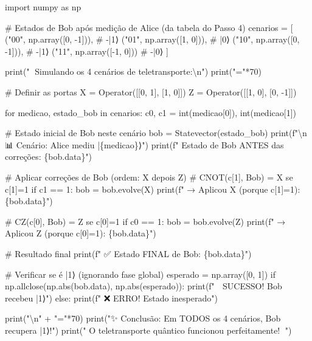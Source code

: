 \documentclass[
  brazilian,
]{report}
\newenvironment{Shaded}{\begin{snugshade}}{\end{snugshade}}
\newcommand{\NormalTok}[1]{\textcolor[rgb]{0.00,0.23,0.31}{#1}}
\begin{document}
\begin{Shaded}
\begin{Highlighting}[]
\NormalTok{import numpy as np}

\NormalTok{\# Estados de Bob após medição de Alice (da tabela do Passo 4)}
\NormalTok{cenarios = [}
\NormalTok{    ("00", np.array([0, {-}1])),      \# {-}|1⟩}
\NormalTok{    ("01", np.array([1, 0])),       \# |0⟩}
\NormalTok{    ("10", np.array([0, {-}1])),      \# {-}|1⟩}
\NormalTok{    ("11", np.array([{-}1, 0]))       \# {-}|0⟩}
\NormalTok{]}

\NormalTok{print("🔬 Simulando os 4 cenários de teletransporte:\textbackslash{}n")}
\NormalTok{print("="*70)}

\NormalTok{\# Definir as portas}
\NormalTok{X = Operator([[0, 1], [1, 0]])}
\NormalTok{Z = Operator([[1, 0], [0, {-}1]])}

\NormalTok{for medicao, estado\_bob in cenarios:}
\NormalTok{    c0, c1 = int(medicao[0]), int(medicao[1])}
    
\NormalTok{    \# Estado inicial de Bob neste cenário}
\NormalTok{    bob = Statevector(estado\_bob)}
\NormalTok{    print(f"\textbackslash{}n📊 Cenário: Alice mediu |\{medicao\}⟩")}
\NormalTok{    print(f"   Estado de Bob ANTES das correções: \{bob.data\}")}
    
\NormalTok{    \# Aplicar correções de Bob (ordem: X depois Z)}
\NormalTok{    \# CNOT(c[1], Bob) = X se c[1]=1}
\NormalTok{    if c1 == 1:}
\NormalTok{        bob = bob.evolve(X)}
\NormalTok{        print(f"   → Aplicou X (porque c[1]=1): \{bob.data\}")}
    
\NormalTok{    \# CZ(c[0], Bob) = Z se c[0]=1  }
\NormalTok{    if c0 == 1:}
\NormalTok{        bob = bob.evolve(Z)}
\NormalTok{        print(f"   → Aplicou Z (porque c[0]=1): \{bob.data\}")}
    
\NormalTok{    \# Resultado final}
\NormalTok{    print(f"   ✅ Estado FINAL de Bob: \{bob.data\}")}
    
\NormalTok{    \# Verificar se é |1⟩ (ignorando fase global)}
\NormalTok{    esperado = np.array([0, 1])}
\NormalTok{    if np.allclose(np.abs(bob.data), np.abs(esperado)):}
\NormalTok{        print(f"   🎉 SUCESSO! Bob recebeu |1⟩")}
\NormalTok{    else:}
\NormalTok{        print(f"   ❌ ERRO! Estado inesperado")}

\NormalTok{print("\textbackslash{}n" + "="*70)}
\NormalTok{print("✨ Conclusão: Em TODOS os 4 cenários, Bob recupera |1⟩!")}
\NormalTok{print("   O teletransporte quântico funcionou perfeitamente! 🚀")}
\end{Highlighting}
\end{Shaded}
\end{document}
